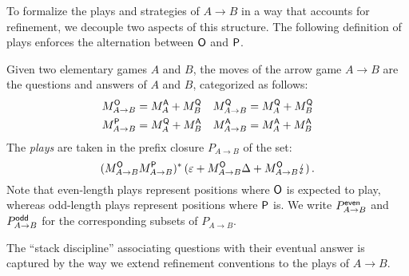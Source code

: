 To formalize the plays and strategies of $A \rightarrow B$
in a way that accounts for refinement,
we decouple two aspects of this structure.
The following definition of plays
enforces the alternation between $ \mathsf{O} $ and $ \mathsf{P} $.

\begin{definition} %
Given two elementary games $A$ and $B$,
the moves of the arrow game $A \rightarrow B$
are the questions and answers of $A$ and $B$,
categorized as follows:
\begin{align*}
  M_{A \rightarrow B}^{ \mathsf{O} } &= M_A^{ \mathsf{A} } + M_B^{ \mathsf{Q} } &
  M_{A \rightarrow B}^{ \mathsf{Q} } &= M_A^{ \mathsf{Q} } + M_B^{ \mathsf{Q} } \\
  M_{A \rightarrow B}^{ \mathsf{P} } &= M_A^{ \mathsf{Q} } + M_B^{ \mathsf{A} } &
  M_{A \rightarrow B}^{ \mathsf{A} } &= M_A^{ \mathsf{A} } + M_B^{ \mathsf{A} }
\end{align*}
The \emph{plays} are taken in
the prefix closure $P_{A \rightarrow B}$ of the set:
\[
    (M_{A \rightarrow B}^{ \mathsf{O} }
     M_{A \rightarrow B}^{ \mathsf{P} })^* \,
    (\varepsilon +
     M_{A \rightarrow B}^{ \mathsf{O} } \Delta +
     M_{A \rightarrow B}^{ \mathsf{O} } \lightning) \,.
\]
Note that
even-length plays represent positions where $ \mathsf{O} $ is expected to play,
whereas odd-length plays represent positions where $ \mathsf{P} $ is.
We write $P_{A \rightarrow B}^{ \mathsf{even} }$ and $P_{A \rightarrow B}^{ \mathsf{odd} }$
for the corresponding subsets of $P_{A \rightarrow B}$.
\end{definition}

The ``stack discipline'' associating questions
with their eventual answer is captured by
the way we extend refinement conventions to
the plays of $A \rightarrow B$.

